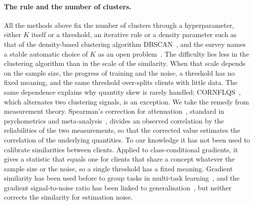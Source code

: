 \paragraph{The rule and the number of clusters.} All the methods above fix the number of clusters through a hyperparameter, either $K$ itself or a threshold, an iterative rule or a density parameter such as that of the density-based clustering algorithm DBSCAN~\citep{ester1996dbscan}, and the survey names a stable automatic choice of $K$ as an open problem~\citep{benali2026survey}. The difficulty lies less in the clustering algorithm than in the scale of the similarity. When that scale depends on the sample size, the progress of training and the noise, a threshold has no fixed meaning, and the same threshold over-splits clients with little data. The same dependence explains why quantity skew is rarely handled; CORNFLQS~\citep{benali2025cornflqs}, which alternates two clustering signals, is an exception. We take the remedy from measurement theory. Spearman's correction for attenuation~\citep{spearman1904,spearman1910,brown1910}, standard in psychometrics and meta-analysis~\citep{muchinsky1996attenuation}, divides an observed correlation by the reliabilities of the two measurements, so that the corrected value estimates the correlation of the underlying quantities. To our knowledge it has not been used to calibrate similarities between clients. Applied to class-conditional gradients, it gives a statistic that equals one for clients that share a concept whatever the sample size or the noise, so a single threshold has a fixed meaning. Gradient similarity has been used before to group tasks in multi-task learning~\citep{fifty2021tag,yu2020pcgrad}, and the gradient signal-to-noise ratio has been linked to generalisation~\citep{liu2020gsnr}, but neither corrects the similarity for estimation noise.

